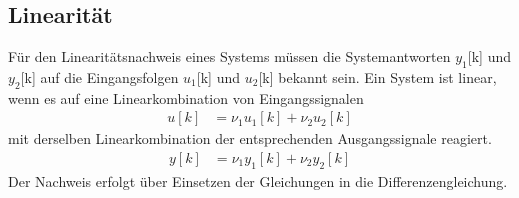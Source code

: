 \subsection{Linearität}\label{sec:linearituxe4t}

Für den Linearitätsnachweis eines Systems müssen die Systemantworten \(y_{1}\){[}k{]} und \(y_{2}\){[}k{]} auf die Eingangsfolgen \(u_{1}\){[}k{]} und \(u_{2}\){[}k{]} bekannt sein. Ein System ist linear, wenn es auf eine Linearkombination von Eingangssignalen
\begin{align}
u[ k] &= \nu_{1}  u_{1}[ k] + \nu_{2}  u_{2}[ k] \label{eq:4.20}
\end{align}
mit derselben Linearkombination der entsprechenden Ausgangssignale reagiert.
\begin{align}
y[ k] &= \nu_{1}  y_{1}[ k] + \nu_{2}  y_{2}[ k] \label{eq:4.21}
\end{align}
Der Nachweis erfolgt über Einsetzen der Gleichungen in die Differenzengleichung.

